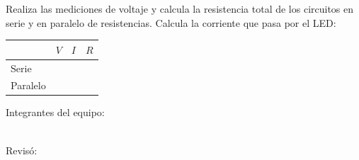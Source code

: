 	Realiza las mediciones de voltaje y calcula la resistencia total de los circuitos en serie y en paralelo de resistencias. Calcula la corriente que pasa por el LED:

	\begin{center}
		\begin{tabular}{|p{1.5cm}|p{1.5cm}|p{1.5cm}|p{1.5cm}|}
			\hline
			         & $V$ & $I$ & $R$ \\
			\hline
			Serie    &     &     &     \\
			\hline
			Paralelo &     &     &     \\
			\hline
		\end{tabular}
	\end{center}

	Integrantes del equipo: \\[0.2cm]
	\horrule{0.5pt} \\[0.2cm] %
	\horrule{0.5pt} %

	Revisó: \\[0.2cm]
	\horrule{0.5pt} \\%
    

